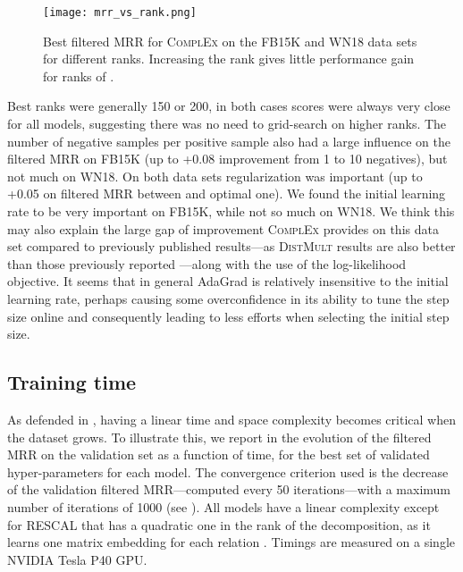 \documentclass[twoside,11pt]{article}
\renewcommand{\cite}{\citep}
\begin{document}
\begin{figure}[t]
	\centering
	\texttt{[image: mrr\_vs\_rank.png]}
	
    \caption{Best filtered MRR for \textsc{ComplEx} on the FB15K and WN18 data sets for different ranks. Increasing the rank gives little performance gain for ranks of .}
	\label{fig:mrr_vs_rank}
	
\end{figure}


Best ranks were generally 150 or 200, in both cases scores were always very close for all models, suggesting there was no need to grid-search on higher ranks. The number of negative samples per positive sample also had a large influence on the filtered MRR on FB15K (up to +0.08 improvement from 1 to 10 negatives), but not much on WN18. On both data sets regularization was important (up to +0.05 on filtered MRR between  and optimal one).
We found the initial learning rate to be very important on FB15K, while not so much on WN18. We think this may also explain the large gap of improvement \textsc{ComplEx} provides on this data set compared to previously published results---as \textsc{DistMult} results are also better than those previously reported \cite{Yang2015}---along with the use of the log-likelihood objective. It seems that in general AdaGrad is relatively insensitive to the initial learning rate, perhaps causing some overconfidence in its ability to tune the step size online and consequently leading to less efforts when selecting the initial step size.



\subsection{Training time}
As defended in , having a linear time and space complexity
becomes critical when the dataset grows. To illustrate this,
we report in  the evolution
of the filtered MRR on the validation set as a function of time,
for the best set of validated hyper-parameters for each model.
The convergence criterion used is the decrease of the validation filtered 
MRR---computed every 50 iterations---with a maximum number of iterations of 1000 (see ).
All models have a linear complexity except for RESCAL that
has a quadratic one in the rank of the decomposition,
as it learns one matrix embedding for each relation .
Timings are measured on a single NVIDIA Tesla P40 GPU.
\end{document}
